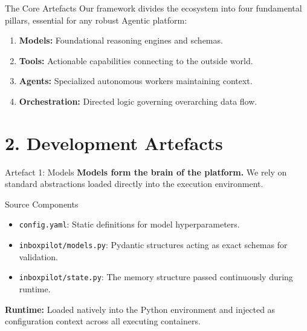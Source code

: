 \documentclass[aspectratio=169, xcolor=table]{beamer}
\begin{document}
\begin{frame}{The Core Artefacts}
    Our framework divides the ecosystem into four fundamental pillars, essential for any robust Agentic platform:
    \vspace{0.3cm}
    \begin{enumerate}
        \item \textbf{Models:} Foundational reasoning engines and schemas.
        \item \textbf{Tools:} Actionable capabilities connecting to the outside world.
        \item \textbf{Agents:} Specialized autonomous workers maintaining context.
        \item \textbf{Orchestration:} Directed logic governing overarching data flow.
    \end{enumerate}
\end{frame}

\section{2. Development Artefacts}

\begin{frame}{Artefact 1: Models}
    \textbf{Models form the brain of the platform.} We rely on standard abstractions loaded directly into the execution environment.
    
    \vspace{0.3cm}
    \begin{block}{Source Components}
        \begin{itemize}
            \item \texttt{config.yaml}: Static definitions for model hyperparameters.
            \item \texttt{inboxpilot/models.py}: Pydantic structures acting as exact schemas for validation.
            \item \texttt{inboxpilot/state.py}: The memory structure passed continuously during runtime.
        \end{itemize}
    \end{block}
    
    \vspace{0.2cm}
    \textbf{Runtime:} Loaded natively into the Python environment and injected as configuration context across all executing containers.
\end{frame}
\end{document}
